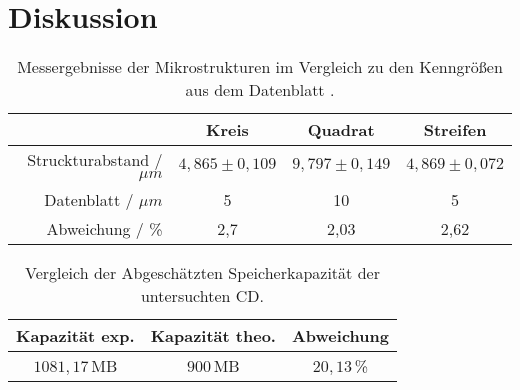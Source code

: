 \section{Diskussion}
\label{sec:Diskussion}

\begin{table}
	\centering
	\caption{Messergebnisse der Mikrostrukturen im Vergleich zu den Kenngr\"o{\ss}en aus dem Datenblatt \cite{sample}.}
\begin{tabular}{|r|ccc|}
	\hline
	{} & {Kreis} & {Quadrat} & {Streifen} \\
	\hline
	Struckturabstand / $\mu m$ & $4,865 \pm 0,109$ & $ 9,797 \pm 0,149$ & $4,869 \pm 0,072$ \\
	Datenblatt / $\mu m$ & 5 & 10 & 5 \\
	Abweichung / \%	& 2,7 & 2,03 & 2,62 \\
	\hline
\end{tabular}
\label{tab:auf1_disk}
\end{table}
\bigskip

\begin{table}
	\centering
	\caption{Vergleich der Abgesch\"atzten Speicherkapazit\"at der untersuchten CD.}
\begin{tabular}{|ccc|}
	\hline
	{Kapazit\"at exp.} & {Kapazit\"at theo.} & {Abweichung} \\
	\hline
	$1081,17 \,$MB & $900 \,$MB & $20,13 \,$\% \\
	\hline
\end{tabular}
\label{tab:auf2_disk}
\end{table}


\bigskip